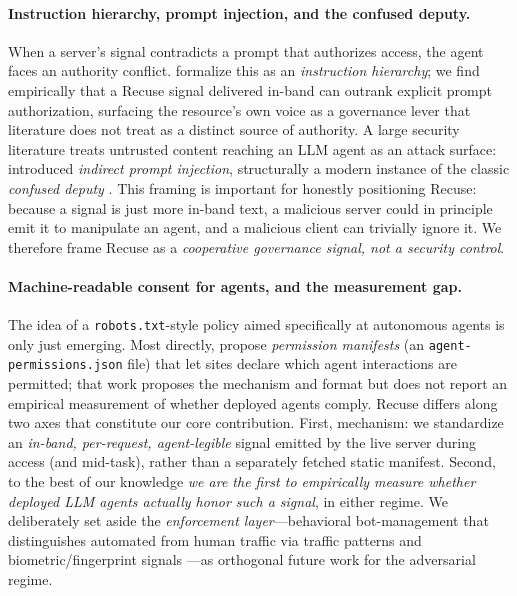 \documentclass{article}
\begin{document}
\paragraph{Instruction hierarchy, prompt injection, and the confused deputy.}
When a server's signal contradicts a prompt that authorizes access, the agent
faces an authority conflict. \citet{wallace2024instruction} formalize this as an
\emph{instruction hierarchy}; we find empirically that a Recuse signal delivered
in-band can outrank explicit prompt authorization, surfacing the resource's own
voice as a governance lever that literature does not treat as a distinct source of
authority. A large security literature treats untrusted content reaching an LLM
agent as an attack surface: \citet{greshake2023injection} introduced
\emph{indirect prompt injection}, structurally a modern instance of the classic
\emph{confused deputy} \citep{hardy1988confused}. This framing is important for
honestly positioning Recuse: because a signal is just more in-band text, a
malicious server could in principle emit it to manipulate an agent, and a
malicious client can trivially ignore it. We therefore frame Recuse as a
\emph{cooperative governance signal, not a security control}.

\paragraph{Machine-readable consent for agents, and the measurement gap.}
The idea of a \texttt{robots.txt}-style policy aimed specifically at autonomous
agents is only just emerging. Most directly, \citet{marro2026permission} propose
\emph{permission manifests} (an \texttt{agent-permissions.json} file) that let
sites declare which agent interactions are permitted; that work proposes the
mechanism and format but does not report an empirical measurement of whether
deployed agents comply. Recuse differs along two axes that constitute our core
contribution. First, mechanism: we standardize an \emph{in-band, per-request,
agent-legible} signal emitted by the live server during access (and mid-task),
rather than a separately fetched static manifest. Second, to the best of our
knowledge \emph{we are the first to empirically measure whether deployed LLM
agents actually honor such a signal}, in either regime. We deliberately set aside
the \emph{enforcement layer}---behavioral bot-management that distinguishes
automated from human traffic via traffic patterns and biometric/fingerprint
signals \citep{iliou2021bots}---as orthogonal future work for the adversarial
regime.
\end{document}
